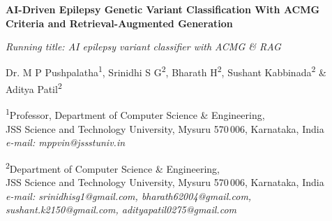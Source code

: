 \documentclass[12pt,a4paper]{article}
\begin{document}
\begin{center}
{\LARGE\bfseries AI-Driven Epilepsy Genetic Variant Classification With
ACMG Criteria and Retrieval-Augmented Generation}

\vspace{0.4cm}
{\small\textit{Running title: AI epilepsy variant classifier with ACMG \& RAG}}

\vspace{0.6cm}

{\normalsize
Dr. M P Pushpalatha\textsuperscript{1},
Srinidhi S G\textsuperscript{2},
Bharath H\textsuperscript{2},
Sushant Kabbinada\textsuperscript{2}
\& Aditya Patil\textsuperscript{2}
}

\vspace{0.3cm}
{\small
\textsuperscript{1}Professor, Department of Computer Science \& Engineering,\\
JSS Science and Technology University, Mysuru 570\,006, Karnataka, India\\
\textit{e-mail: mppvin@jssstuniv.in}

\vspace{0.2cm}
\textsuperscript{2}Department of Computer Science \& Engineering,\\
JSS Science and Technology University, Mysuru 570\,006, Karnataka, India\\
\textit{e-mail: srinidhisg1@gmail.com, bharath62004@gmail.com,
sushant.k2150@gmail.com, adityapatil0275@gmail.com}
}

\end{center}

\vspace{0.5cm}
\end{document}
